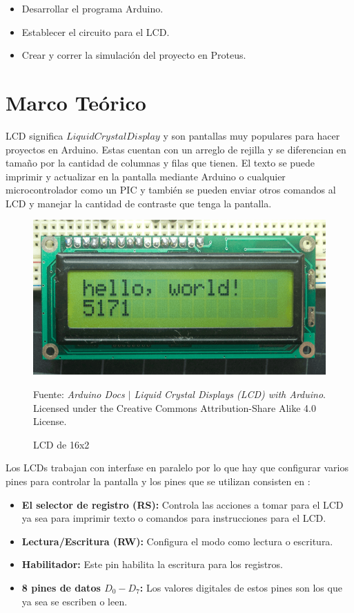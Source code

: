 \documentclass{article}
\begin{document}
    \begin{itemize}
        \item Desarrollar el programa Arduino.
        \item Establecer el circuito para el LCD.
        \item Crear y correr la simulación del proyecto en Proteus.
    \end{itemize}

    \section{Marco Teórico}

    LCD significa $Liquid Crystal Display$ y son pantallas muy populares para hacer proyectos en Arduino. Estas cuentan con un arreglo de rejilla y se diferencian en tamaño por la cantidad de columnas y filas que tienen. El texto se puede imprimir y actualizar en la pantalla mediante Arduino o cualquier microcontrolador como un PIC y también se pueden enviar otros comandos al LCD y manejar la cantidad de contraste que tenga la pantalla.

    \begin{figure}[H]
        \centering
        \includegraphics[width=0.3\paperwidth]{images/lcd-photo.png}
        \caption{LCD de 16x2}\footnotesize
        Fuente: \textit{Arduino Docs $\mid$ Liquid Crystal Displays (LCD) with Arduino}. Licensed under the Creative Commons Attribution-Share Alike 4.0 License. \cite{arduino-docs-lcd-2021}
    \end{figure}

    Los LCDs trabajan con interfase en paralelo por lo que hay que configurar varios pines para controlar la pantalla y los pines que se utilizan consisten en \cite{arduino-docs-lcd-2021}:

    \begin{itemize}
        \item \textbf{El selector de registro (RS):} Controla las acciones a tomar para el LCD ya sea para imprimir texto o comandos para instrucciones para el LCD.
        \item \textbf{Lectura/Escritura (RW):} Configura el modo como lectura o escritura.
        \item \textbf{Habilitador:} Este pin habilita la escritura para los registros.
        \item \textbf{8 pines de datos $D_0-D_7$:} Los valores digitales de estos pines son los que ya sea se escriben o leen.
    \end{itemize}
\end{document}
